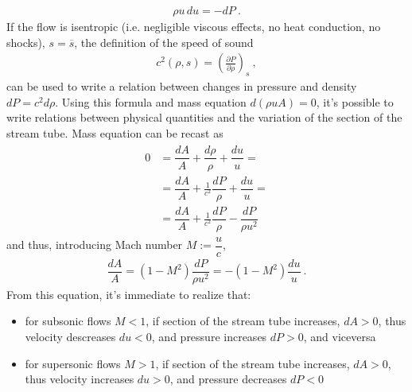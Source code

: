 \documentclass[letterpaper,10pt,english]{jupyterBook}
\begin{document}
\begin{equation*}
\begin{split}\rho u \, du = - dP \ .\end{split}
\end{equation*}
\sphinxAtStartPar
If the flow is isentropic (i.e. negligible viscous effects, no heat conduction, no shocks), \(s = \overline{s}\), the definition of the speed of sound
\begin{equation*}
\begin{split}c^2(\rho, s) = \left( \frac{\partial P}{\partial \rho} \right)_s \ ,\end{split}
\end{equation*}
\sphinxAtStartPar
can be used to write a relation between changes in pressure and density \(d P = c^2 d \rho\). Using this formula and mass equation \(d(\rho u A) = 0\), it’s possible to write relations between physical quantities and the variation of the section of the stream tube. Mass equation can be recast as
\begin{equation*}
\begin{split}\begin{aligned}
  0 & = \dfrac{dA}{A} + \dfrac{d \rho}{\rho} + \dfrac{d u}{u} = \\
    & = \dfrac{dA}{A} + \frac{1}{c^2} \dfrac{d P}{\rho} + \dfrac{d u}{u} = \\
    & = \dfrac{dA}{A} + \frac{1}{c^2} \dfrac{d P}{\rho} - \dfrac{d P}{\rho u^2} 
\end{aligned}\end{split}
\end{equation*}
\sphinxAtStartPar
and thus, introducing Mach number \(M := \dfrac{u}{c}\),
\begin{equation*}
\begin{split}\dfrac{d A}{A} = (1 - M^2)\dfrac{dP}{\rho u^2} = -(1 - M^2)\dfrac{du}{u} \ .\end{split}
\end{equation*}
\sphinxAtStartPar
From this equation, it’s immediate to realize that:
\begin{itemize}
\item {} 
\sphinxAtStartPar
for subsonic flows \(M<1\), if section of the stream tube increases, \(dA > 0\), thus velocity descreases \(du < 0\), and pressure increases \(dP > 0\), and viceversa

\item {} 
\sphinxAtStartPar
for supersonic flows \(M>1\), if section of the stream tube increases, \(dA > 0\), thus velocity increases \(du > 0\), and pressure decreases \(dP < 0\)

\end{itemize}
\end{document}
